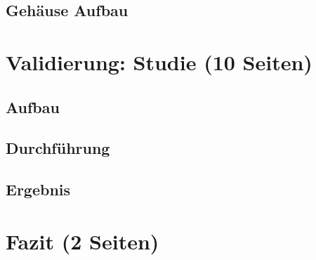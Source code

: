 \section{Gehäuse Aufbau}

\chapter{Validierung: Studie (10 Seiten)}
\section{Aufbau}
\section{Durchführung}
\section{Ergebnis}

\chapter{Fazit (2 Seiten)}
